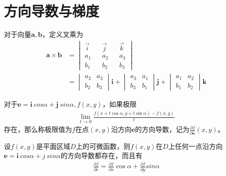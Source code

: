 \documentclass[lang=cn,10pt]{elegantbook}
\newcommand\bv[1]{\boldsymbol{#1}}
\begin{document}
\section{方向导数与梯度}
\begin{definition}[叉乘]\label{de9.1}
    对于向量$\bv{a,b}$，定义叉乘为
    \begin{equation*}
        \begin{aligned}
            \bv{a}\times \bv{b} & =
            \begin{vmatrix}
                \vec{i} &  & \vec{j} &  & \vec{k} \\
                a_1     &  & a_2     &  & a_3     \\
                b_1     &  & b_2     &  & b_3
            \end{vmatrix} \\
                                & =
            \begin{vmatrix}
                a_2 & a_3 \\
                b_2 & b_3
            \end{vmatrix}
            \mathbf{i}+
            \begin{vmatrix}
                a_3 & a_1 \\
                b_3 & b_1
            \end{vmatrix}
            \mathbf{j}+
            \begin{vmatrix}
                a_1 & a_2 \\
                b_1 & b_2
            \end{vmatrix}
            \mathbf{k}
        \end{aligned}
    \end{equation*}
\end{definition}

\begin{definition}[方向导数]
    对于$\bv{e} = \bv{i}~cos\alpha+\bv{j}~sin\alpha,f(x,y)$，如果极限
    \begin{equation}
        \begin{aligned}
            \lim_{t\to0}\frac{f(x+t\cos\alpha,y+t\sin\alpha)-f(x,y)}t
        \end{aligned}
    \end{equation}
    存在，那么称极限值为$f$在点$(x,y)$沿方向$\bv{e}$的方向导数，记为$\frac{\partial f}{\partial \bv{e}}(x,y)$。
\end{definition}

\begin{theorem}
    设$f(x,y)$是平面区域$D$上的可微函数，则$f(x,y)$在$D$上任何一点沿方向
    $\bv{e} = \bv{i}~cos\alpha+j~sin\alpha$的方向导数都存在，而且有
    \begin{equation}
        \begin{aligned}
            \frac{\partial f}{\partial e}=\frac{\partial f}{\partial x}\cos\alpha+\frac{\partial f}{\partial y}sin\alpha
        \end{aligned}
    \end{equation}
\end{theorem}
\end{document}
